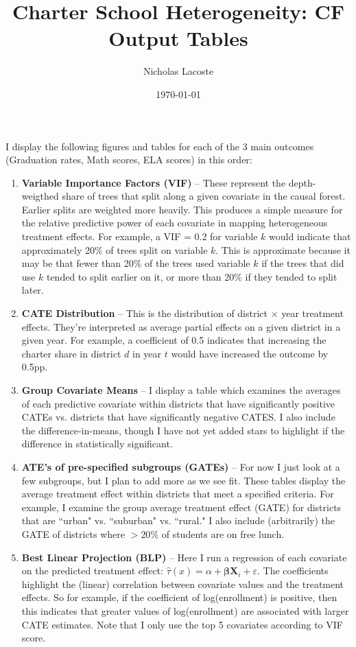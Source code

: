 \documentclass{article} %
\title{Charter School Heterogeneity: CF Output Tables} %
\author{Nicholas Lacoste} %
\date{\today} %
\begin{document}
    \maketitle %

I display the following figures and tables for each of the 3 main outcomes (Graduation rates, Math scores, ELA scores) in this order:
\begin{enumerate}
	\item \textbf{Variable Importance Factors (VIF)} -- These represent the depth-weigthed share of trees that split along a given covariate in the causal forest. Earlier splits are weighted more heavily. This produces a simple measure for the relative predictive power of each covariate in mapping heterogeneous treatment effects. For example, a VIF = 0.2 for variable $k$ would indicate that approximately 20\% of trees split on variable $k$. This is approximate because it may be that fewer than 20\% of the trees used variable $k$ if the trees that did use $k$ tended to split earlier on it, or more than 20\% if they tended to split later.
	\item \textbf{CATE Distribution} -- This is the distribution of district $\times$ year treatment effects. They're interpreted as average partial effects on a given district in a given year. For example, a coefficient of 0.5 indicates that increasing the charter share in district $d$ in year $t$ would have increased the outcome by 0.5pp.
	\item \textbf{Group Covariate Means} -- I display a table which examines the averages of each predictive covariate within districts that have significantly positive CATEs vs. districts that have significantly negative CATES. I also include the difference-in-means, though I have not yet added stars to highlight if the difference in statistically significant. 
	\item \textbf{ATE's of pre-specified subgroups (GATEs)} -- For now I just look at a few subgroups, but I plan to add more as we see fit. These tables display the average treatment effect within districts that meet a specified criteria. For example, I examine the group average treatment effect (GATE) for districts that are ``urban" vs. ``suburban" vs. ``rural." I also include (arbitrarily) the GATE of districts where $> 20\%$ of students are on free lunch.
	\item \textbf{Best Linear Projection (BLP)} -- Here I run a regression of each covariate on the predicted treatment effect: $\hat{\tau}(x) = \alpha + \boldsymbol{\beta} \boldsymbol{X}_i + \varepsilon$. The coefficients highlight the (linear) correlation between covariate values and the treatment effects. So for example, if the coefficient of log(enrollment) is positive, then this indicates that greater values of log(enrollment) are associated with larger CATE estimates. Note that I only use the top 5 covariates according to VIF score. 
\end{enumerate}
\end{document}
